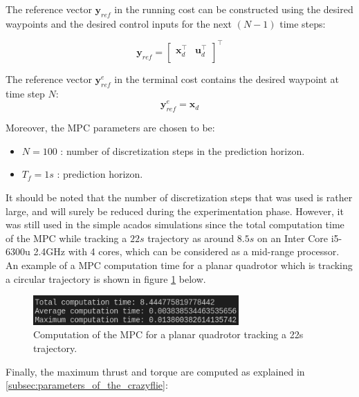 \documentclass{thesisreport}
\begin{document}
 The reference vector $\bm{y}_{ref}$ in the running cost can be constructed using the desired waypoints and the desired control inputs for the next $(N-1)$ time steps:

\begin{equation}
	\bm{y}_{ref} = \begin{bmatrix}
		\bm{x}_d^{\intercal} & \bm{u}_d^{\intercal} \\
	\end{bmatrix}^{\intercal}
\end{equation}

The reference vector $\bm{y}_{ref}^e$ in the terminal cost contains the desired waypoint at time step $N$:
\begin{equation}
	\bm{y}_{ref}^e = \bm{x}_d
\end{equation}

\newpage

Moreover, the MPC parameters are chosen to be:
\begin{itemize}
	\item $N = 100$ : number of discretization steps in the prediction horizon.
	\item $T_f = 1s$ : prediction horizon.
\end{itemize}

It should be noted that the number of discretization steps that was used is rather large, and will surely be reduced during the experimentation phase. However, it was still used in the simple acados simulations since the total computation time of the MPC while tracking a $22s$ trajectory as around $8.5s$ on an Inter Core i5-6300u 2.4GHz with 4 cores, which can be considered as a mid-range processor. An example of a MPC computation time for a planar quadrotor which is tracking a circular trajectory is shown in figure \ref{fig:computation_time_planar_quadrotor} below.

\begin{figure}[h]
	\centering
	\includegraphics[width=0.7\textwidth]{Images/acados_simulations/circular_trajectory/planar_drone/computation_time.png}
	\caption{Computation of the MPC for a planar quadrotor tracking a 22s trajectory.}
	\label{fig:computation_time_planar_quadrotor}
\end{figure}

Finally, the maximum thrust and torque are computed as explained in \ref{subsec:parameters_of_the_crazyflie}: 
\end{document}
